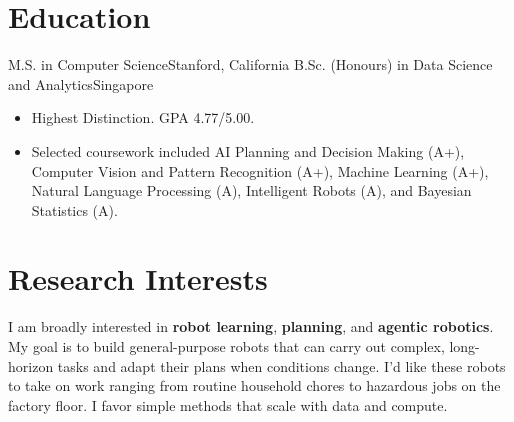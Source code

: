 \section{Education}
  {M.S. in Computer Science}{Stanford, California}
\entryspace
{}
  {B.Sc. (Honours) in Data Science and Analytics}{Singapore}
\begin{itemize}
  \item Highest Distinction. GPA 4.77/5.00.
  \item Selected coursework included AI Planning and Decision Making (A+), Computer Vision and Pattern Recognition (A+), Machine Learning (A+), Natural Language Processing (A), Intelligent Robots (A), and Bayesian Statistics (A).
\end{itemize}

\section{Research Interests}
I am broadly interested in \textbf{robot learning}, \textbf{planning}, and \textbf{agentic robotics}. My goal is to build general-purpose robots that can carry out complex, long-horizon tasks and adapt their plans when conditions change. I'd like these robots to take on work ranging from routine household chores to hazardous jobs on the factory floor. I favor simple methods that scale with data and compute.
